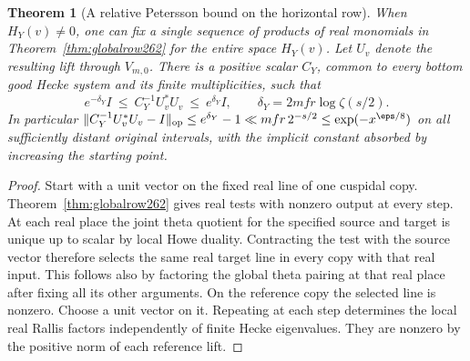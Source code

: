 \documentclass[a4paper,11pt]{article}
\newtheorem{theorem}[proposition]{Theorem}
\theoremstyle{definition}
\theoremstyle{remark}
\numberwithin{equation}{section}
\begin{document}
\begin{theorem}[A relative Petersson bound on the horizontal row]\leavevmode
\label{thm:rowgram262}
When \(H_Y(v)\ne0\), one can fix a single sequence of products
of real monomials in Theorem~\ref{thm:globalrow262} for the
entire space \(H_Y(v)\). Let \(U_v\) denote the resulting lift
through \(V_{m,0}\). There is a positive scalar \(C_Y\), common
to every bottom good Hecke system and its finite multiplicities,
such that
\[
  e^{-\delta_Y}I\ \le\ C_Y^{-1}U_v^*U_v\ \le\ e^{\delta_Y}I,
             \qquad \delta_Y=2mfr\log\zeta(s/2).
\]
In particular \(\|C_Y^{-1}U_v^*U_v-I\|_{\rm op}
\le e^{\delta_Y}-1\ll mfr\,2^{-s/2}\le\exp(-x^{\eps/8})\)
on all sufficiently distant original intervals, with the implicit
constant absorbed by increasing the starting point.
\end{theorem}
\begin{proof}
Start with a unit vector on the fixed real line of one cuspidal
copy. Theorem~\ref{thm:globalrow262} gives real tests with
nonzero output at every step. At each real place the joint
theta quotient for the specified source and target is unique up
to scalar by local Howe duality. Contracting the test with the
source vector therefore selects the same real target line in
every copy with that real input. This follows also by factoring
the global theta pairing at that real place after fixing all its
other arguments. On the reference copy the selected line is
nonzero. Choose a unit vector on it. Repeating at each step
determines the local real Rallis factors independently of finite
Hecke eigenvalues. They are nonzero by the positive norm of
each reference lift.


\end{proof}
\end{document}
